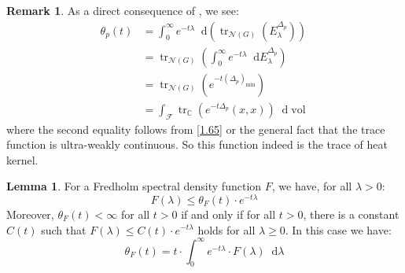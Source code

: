 \documentclass[11pt]{report}
\theoremstyle{definition}
\newtheorem{Lemma}[Def]{Lemma}
\newtheorem{Rmk}{Remark}[chapter]
\theoremstyle{plain}
\DeclareMathOperator{\tr}{tr}
\DeclareMathOperator{\vol}{vol}
\newcommand{\complex}{\mathbb{C}}
\newcommand{\vna}{\mathcal{N}}
\newcommand{\mass}[1]{\mathop{}\mathrm{d}{#1}}
\begin{document}
\begin{Rmk}\label{3.138}
As a direct consequence of , we see:
\begin{equation}
\begin{split}
\theta_p(t)&=\int_{0}^{\infty}e^{-t\lambda}\mass{(\tr_{\vna(G)}(E^{\Delta_p}_\lambda))}\\
&=\tr_{\vna(G)}(\int_{0}^{\infty}e^{-t\lambda}\mass{E^{\Delta_p}_\lambda})\\
&=\tr_{\vna(G)}(e^{-t(\Delta_p)_{\min}})\\
&=\int_{\mathcal{F}}\tr_{\complex}(e^{-t\Delta_p}(x,x))\mass{\vol}
\end{split}
\end{equation}
where the second equality follows from \ref{1.65} or the general fact that the trace function is ultra-weakly continuous. So this function indeed is the trace of heat kernel.
\end{Rmk}
\begin{Lemma}\label{3.139}
	For a Fredholm spectral density function $F$, we have, for all $\lambda>0$:
	\begin{equation}
	F(\lambda)\leq \theta_F(t)\cdot e^{-t\lambda}
	\end{equation}
	Moreover, $\theta_F(t)<\infty$ for all $ t>0$ if and only if for all $t>0$, there is a constant $C(t)$ such that $F(\lambda)\leq C(t)\cdot e^{-t\lambda}$ holds for all $\lambda\geq 0$. In this case we have:
	\begin{equation}\label{3.140}
	\theta_F(t)=t\cdot \int_{0}^\infty e^{-t\lambda}\cdot F(\lambda)\mass{\lambda}
	\end{equation}
\end{Lemma}
\end{document}
